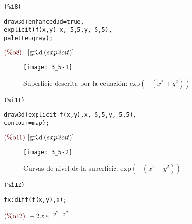 \documentclass[12pt]{article}
\begin{document}
\noindent
\begin{minipage}[t]{8ex}{\color{red}\bf
\begin{verbatim}
(%i8) 
\end{verbatim}}
\end{minipage}
\begin{minipage}[t]{\textwidth}{\color{blue}
\begin{verbatim}
draw3d(enhanced3d=true,
explicit(f(x,y),x,-5,5,y,-5,5),
palette=gray);
\end{verbatim}}
\end{minipage}
\begin{math}\displaystyle
\parbox{8ex}{\color{labelcolor}(\%o8) }
[\mathrm{gr3d}\left( explicit\right) ]
\end{math}
\begin{figure}[H]
\centering
\texttt{[image: 3\_5-1]}
\caption{Superficie descrita por la ecuación: $\mathrm{exp}\left( -\left( {x}^{2}+{y}^{2}\right) \right)$}
\end{figure}

\noindent
\begin{minipage}[t]{8ex}{\color{red}\bf
\begin{verbatim}
(%i11) 
\end{verbatim}}
\end{minipage}
\begin{minipage}[t]{\textwidth}{\color{blue}
\begin{verbatim}
draw3d(explicit(f(x,y),x,-5,5,y,-5,5),
contour=map);
\end{verbatim}}
\end{minipage}
\begin{math}\displaystyle
\parbox{8ex}{\color{labelcolor}(\%o11) }
[\mathrm{gr3d}\left( explicit\right) ]
\end{math}
\begin{figure}[H]
\centering
\texttt{[image: 3\_5-2]}
\caption{Curvas de nivel de la superficie: $\mathrm{exp}\left( -\left( {x}^{2}+{y}^{2}\right) \right)$}
\end{figure}

\noindent
\begin{minipage}[t]{8ex}{\color{red}\bf
\begin{verbatim}
(%i12) 
\end{verbatim}}
\end{minipage}
\begin{minipage}[t]{\textwidth}{\color{blue}
\begin{verbatim}
fx:diff(f(x,y),x);
\end{verbatim}}
\end{minipage}
\begin{math}\displaystyle
\parbox{8ex}{\color{labelcolor}(\%o12) }
-2\,x\,{e}^{-{y}^{2}-{x}^{2}}
\end{math}
\end{document}
